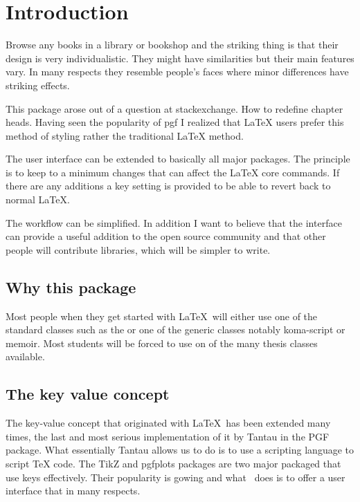 \chapter{Introduction}



Browse any books in a library or bookshop and the striking thing is that their design is very individualistic. They might have similarities but their main features vary. In many respects they resemble people's faces where minor differences have striking effects.

This package arose out of a question at stackexchange. How to redefine chapter heads. Having seen the popularity of pgf I realized that LaTeX users prefer this method of styling rather the traditional LaTeX method.

The user interface can be extended to basically all major packages. The principle is to keep to a minimum changes that can affect the LaTeX core commands. If there are any additions a key setting is provided to be able to revert back to normal LaTeX.

The workflow can be simplified. In addition I want to believe that the interface can provide a useful addition to the open source community and that other people will contribute libraries, which will be simpler to write.

\section{Why this package}

Most people when they get started with \LaTeX\ will either use one of the standard classes such as the  or one of the generic classes notably koma-script or memoir. Most students will be forced to use on of the many thesis classes available.

\section{The key value concept}

The key-value concept that originated with \LaTeX\ has been extended many times, the last and most serious implementation of it by Tantau in the PGF package. What essentially Tantau allows us to do is to use a scripting language to script TeX code. The TikZ and pgfplots packages are two major packaged that use keys effectively. Their popularity is gowing and what \athena\ does is to offer a user interface that in many respects.


